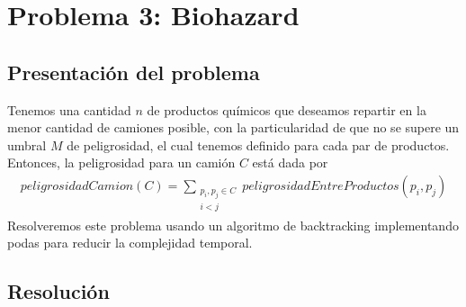 \section{Problema 3: Biohazard}

\subsection{Presentaci\'on del problema}
Tenemos una cantidad $n$ de productos químicos que deseamos repartir en la menor cantidad de camiones posible, con la particularidad de que no se supere un umbral $M$ de peligrosidad, el cual tenemos definido para cada par de productos. Entonces, la peligrosidad para un camión $C$ está dada por
\begin{align*}
peligrosidadCamion(C) = \sum\limits_{\substack{p_i,p_j \in C \\ i < j}} peligrosidadEntreProductos(p_i,p_j)
\end{align*}
Resolveremos este problema usando un algoritmo de backtracking implementando podas para reducir la complejidad temporal.

\subsection{Resoluci\'on}
